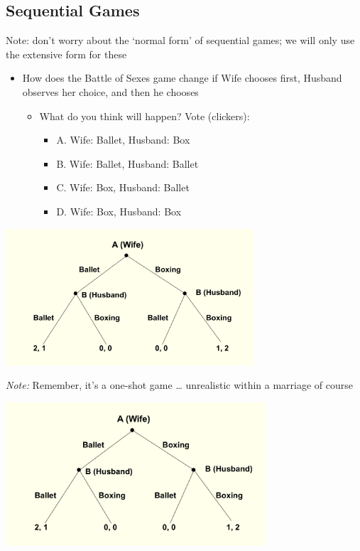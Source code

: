 \documentclass[]{article}
\providecommand{\tightlist}{%
  \setlength{\itemsep}{0pt}\setlength{\parskip}{0pt}}
\begin{document}
\hypertarget{sequential-games}{%
\subsection{Sequential Games}\label{sequential-games}}

Note: don't worry about the `normal form' of sequential games; we will only use the extensive form for these

\begin{itemize}
\tightlist
\item
  How does the Battle of Sexes game change if Wife chooses first, Husband observes her choice, and then he chooses

  \begin{itemize}
  \tightlist
  \item
    What do you think will happen? Vote (clickers):

    \begin{itemize}
    \tightlist
    \item
      A. Wife: Ballet, Husband: Box
    \item
      B. Wife: Ballet, Husband: Ballet
    \item
      C. Wife: Box, Husband: Ballet
    \item
      D. Wife: Box, Husband: Box
    \end{itemize}
  \end{itemize}
\end{itemize}

\includegraphics[height=2in]{picsfigs/BOS_sequential.png}

\emph{Note:} Remember, it's a one-shot game \ldots{} unrealistic within a marriage of course

\includegraphics[height=2.1in]{picsfigs/BOS_sequential.png}
\end{document}
